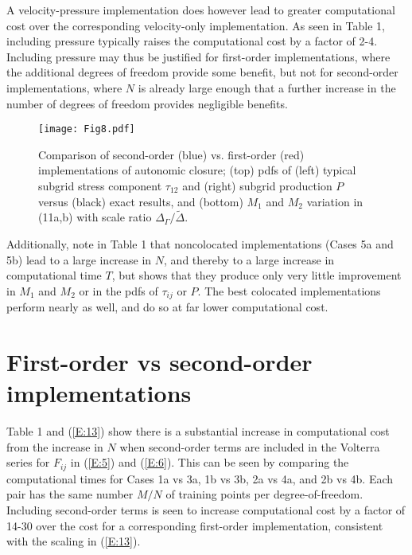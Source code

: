 A velocity-pressure implementation does however lead to greater computational cost over the corresponding velocity-only implementation. As seen in Table 1, including pressure typically raises the computational cost by a factor of 2-4. Including pressure may thus be justified for first-order implementations, where the additional degrees of freedom provide some benefit, but not for second-order implementations, where $N$ is already large enough that a further increase in the number of degrees of freedom provides negligible benefits.

%
\begin{figure}
	\begin{center}
	\texttt{[image: Fig8.pdf]}
	\caption{ Comparison of second-order (blue) vs. first-order (red) implementations of autonomic closure; (top) pdfs of (left) typical subgrid stress component $\tau_{12}$ and (right) subgrid production $P$ versus (black) exact results, and (bottom) $M_1$ and $M_2$ variation in (11a,b) with scale ratio $\Delta_{\Gamma}/\widetilde{\Delta}$.}
	\label{F:8}
	\end{center}
\end{figure}
%

Additionally, note in Table 1 that noncolocated implementations (Cases 5a and 5b) lead to a large increase in $N$, and thereby to a large increase in computational time $T$, but  shows that they produce only very little improvement in  $M_1$ and $M_2$  or in the pdfs of  $\tau_{ij}$ or $P$. The best colocated implementations perform nearly as well, and do so at far lower computational cost.

\section{First-order vs second-order implementations}
\label{sec:IVD}

Table 1 and (\ref{E:13}) show there is a substantial increase in computational cost from the increase in $N$ when second-order terms are included in the Volterra series for  $F_{ij}$ in (\ref{E:5}) and (\ref{E:6}). This can be seen by comparing the computational times for Cases 1a vs 3a, 1b vs 3b, 2a vs 4a, and 2b vs 4b. Each pair has the same number  $M/N$ of training points per degree-of-freedom. Including second-order terms is seen to increase computational cost by a factor of 14-30 over the cost for a corresponding first-order implementation, consistent with the scaling in (\ref{E:13}).  

